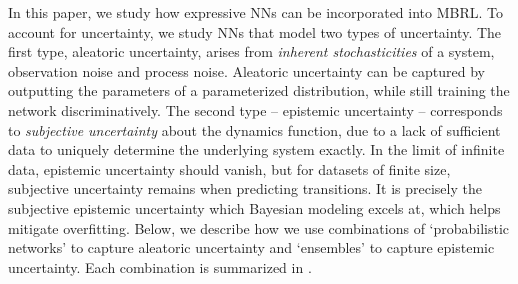 In this paper, we study how expressive NNs can be incorporated into MBRL. 
To account for uncertainty, we study NNs that model two types of uncertainty. 
The first type, aleatoric uncertainty, arises from \textit{inherent stochasticities} of a system, \eg{} observation noise and process noise.
Aleatoric uncertainty can be captured by outputting the parameters of a parameterized distribution, while still training the network discriminatively. 
The second type -- epistemic uncertainty -- corresponds to \textit{subjective uncertainty} about the dynamics function, due to a lack of sufficient data to uniquely determine the underlying system exactly.
In the limit of infinite data, epistemic uncertainty should vanish, but for datasets of finite size, subjective uncertainty remains when predicting transitions. 
It is precisely the subjective epistemic uncertainty which Bayesian modeling excels at, which helps mitigate overfitting.
Below, we describe how we use combinations of `probabilistic networks' to capture aleatoric uncertainty and `ensembles' to capture epistemic uncertainty. 
Each combination is summarized in .
		

